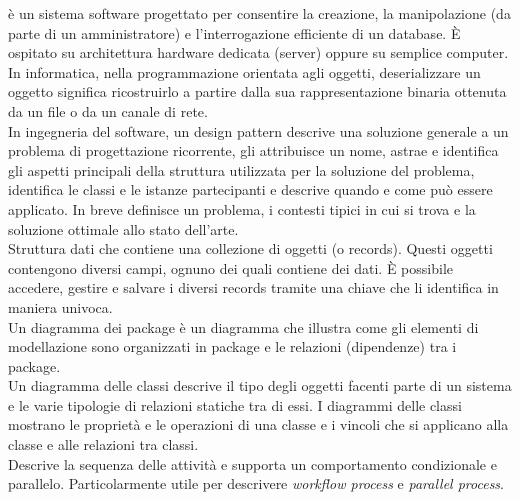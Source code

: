 \documentclass{scalatekids-article}
\begin{document}
 è un sistema software progettato per consentire la creazione, la manipolazione (da parte di un amministratore) e l'interrogazione efficiente di un database.
È ospitato su architettura hardware dedicata (server) oppure su semplice computer.
\\

 In informatica, nella programmazione orientata agli oggetti, deserializzare un oggetto significa ricostruirlo a partire dalla sua rappresentazione binaria ottenuta da un file o da un canale di rete.
\\

 In ingegneria del software, un design pattern descrive una soluzione generale a un problema di progettazione ricorrente, gli attribuisce un nome, astrae e identifica gli aspetti principali della struttura utilizzata per la soluzione del problema, identifica le classi e le istanze partecipanti e descrive quando e come può essere applicato. In breve definisce un problema, i contesti tipici in cui si trova e la soluzione ottimale allo stato dell'arte.
\\

 Struttura dati che contiene una collezione di oggetti (o records).
Questi oggetti contengono diversi campi, ognuno dei quali contiene dei dati.
È possibile accedere, gestire e salvare i diversi records tramite una chiave che li identifica in maniera univoca.
\\

 Un diagramma dei package è un diagramma che illustra come gli elementi di modellazione sono organizzati in package e le relazioni (dipendenze) tra i package.
\\

 Un diagramma delle classi descrive il tipo degli oggetti facenti parte di un sistema e le varie tipologie di relazioni statiche tra di essi.
I diagrammi delle classi mostrano le proprietà e le operazioni di una classe e i vincoli che si applicano alla classe e alle relazioni tra classi. 
\\

 Descrive la sequenza delle attività e supporta un comportamento condizionale e parallelo. Particolarmente utile per descrivere \textit{workflow process} e \textit{parallel process}.
\\
\end{document}
